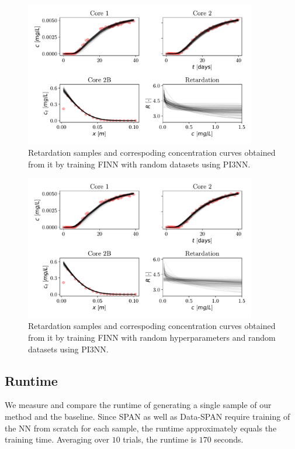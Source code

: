\begin{figure}
    \centering
    \includegraphics[width=0.9\textwidth]{figs/finn_dataspan_samples.pdf}
    \caption{Retardation samples and correspoding concentration curves obtained from it by training FINN with random datasets using PI3NN.}
    \label{fig:dataspan_samples}
\end{figure}

\begin{figure}
    \centering
    \includegraphics[width=0.9\textwidth]{figs/finn_fullspan_samples.pdf}
    \caption{Retardation samples and correspoding concentration curves obtained from it by training FINN with random hyperparameters and random datasets using PI3NN.}
    \label{fig:fullspan_samples}
\end{figure}




\subsection{Runtime}
We measure and compare the runtime of generating a single sample of our method and the baseline. Since SPAN as well as Data-SPAN require training of the NN from scratch for each sample, the runtime approximately equals the training time. Averaging over $10$ trials, the runtime is $170$ seconds.

